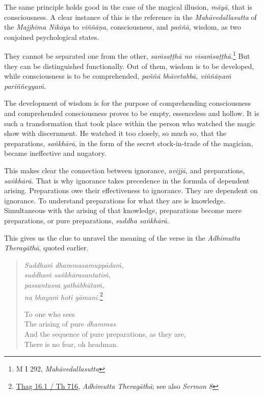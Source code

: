 The same principle holds good in the case of the magical illusion, \emph{māyā}, that is consciousness. A clear instance of this is the reference in the \emph{Mahāvedallasutta} of the \emph{Majjhima Nikāya} to \emph{viññāṇa}, consciousness, and \emph{paññā}, wisdom, as two conjoined psychological states.

They cannot be separated one from the other, \emph{saṁsaṭṭhā no visaṁsaṭṭhā}.\footnote{M I 292, \emph{Mahāvedallasutta}} But they can be distinguished functionally. Out of them, wisdom is to be developed, while consciousness is to be comprehended, \emph{paññā bhāvetabbā, viññāṇaṁ pariññeyyaṁ}.

The development of wisdom is for the purpose of comprehending consciousness and comprehended consciousness proves to be empty, essenceless and hollow. It is such a transformation that took place within the person who watched the magic show with discernment. He watched it too closely, so much so, that the preparations, \emph{saṅkhārā}, in the form of the secret stock-in-trade of the magician, became ineffective and nugatory.

This makes clear the connection between ignorance, \emph{avijjā}, and preparations, \emph{saṅkhārā}. That is why ignorance takes precedence in the formula of dependent arising. Preparations owe their effectiveness to ignorance. They are dependent on ignorance. To understand preparations for what they are is knowledge. Simultaneous with the arising of that knowledge, preparations become mere preparations, or pure preparations, \emph{suddha saṅkhārā}.

This gives us the clue to unravel the meaning of the verse in the \emph{Adhimutta Theragāthā}, quoted earlier.

\begin{quote}
\emph{Suddhaṁ dhammasamuppādaṁ,}\\
\emph{suddhaṁ saṅkhārasantatiṁ,}\\
\emph{passantassa yathābhūtaṁ,}\\
\emph{na bhayaṁ hoti gāmani.}\footnote{\href{https://suttacentral.net/thag16.1/pli/ms}{Thag 16.1 / Th 716}, \emph{Adhimutta Theragāthā}; see also \emph{Sermon 8}}

To one who sees\\
The arising of pure \emph{dhammas}\\
And the sequence of pure preparations, as they are,\\
There is no fear, oh headman.
\end{quote}

